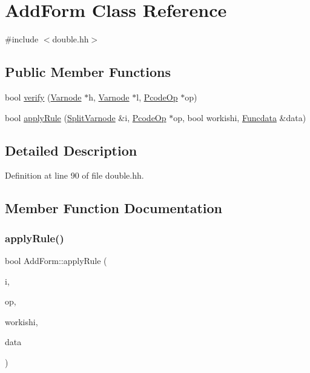 \hypertarget{class_add_form}{}\section{Add\+Form Class Reference}
\label{class_add_form}


{\ttfamily \#include $<$double.\+hh$>$}

\subsection*{Public Member Functions}
\begin{DoxyCompactItemize}
\item 
bool \mbox{\hyperlink{class_add_form_a8209972b6d883948177d25dd9c4d9268}{verify}} (\mbox{\hyperlink{class_varnode}{Varnode}} $\ast$h, \mbox{\hyperlink{class_varnode}{Varnode}} $\ast$l, \mbox{\hyperlink{class_pcode_op}{Pcode\+Op}} $\ast$op)
\item 
bool \mbox{\hyperlink{class_add_form_a843a5b86cf92fddc19ce26b26ec13e48}{apply\+Rule}} (\mbox{\hyperlink{class_split_varnode}{Split\+Varnode}} \&i, \mbox{\hyperlink{class_pcode_op}{Pcode\+Op}} $\ast$op, bool workishi, \mbox{\hyperlink{class_funcdata}{Funcdata}} \&data)
\end{DoxyCompactItemize}


\subsection{Detailed Description}


Definition at line 90 of file double.\+hh.



\subsection{Member Function Documentation}
\mbox{\label{class_add_form_a843a5b86cf92fddc19ce26b26ec13e48}} 
\subsubsection{\texorpdfstring{applyRule()}{applyRule()}}
{\footnotesize\ttfamily bool Add\+Form\+::apply\+Rule (\begin{DoxyParamCaption}\item[{\mbox{\hyperlink{class_split_varnode}{Split\+Varnode}} \&}]{i,  }\item[{\mbox{\hyperlink{class_pcode_op}{Pcode\+Op}} $\ast$}]{op,  }\item[{bool}]{workishi,  }\item[{\mbox{\hyperlink{class_funcdata}{Funcdata}} \&}]{data }\end{DoxyParamCaption})}



